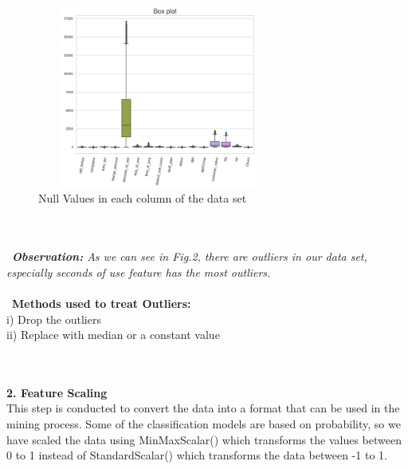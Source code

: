 \documentclass[a4paper, 10pt, conference]{ieeeconf}      %
\begin{document}
\begin{figure}[htp]
    \centering
    \includegraphics[width=8cm,height=6cm]{Images/boxplot.png}
    \caption{Null Values in each column of the data set}
    \label{fig:boxplot}
\end{figure}
\\\
\\\
\textit{\textbf{Observation:} As we can see in Fig.2, there are outliers in our data set, especially seconds of use feature has the most outliers.}
\\\
\\\
\textbf{Methods used to treat Outliers:}
\\i) Drop the outliers
\\ii) Replace with median or a constant value

\\\
\\\textbf{2. Feature Scaling}
\\This step is conducted to convert the data into a format that can be used in the mining process. Some of the classification models are based on probability, so we have scaled the data using MinMaxScalar() which transforms the values between 0 to 1 instead of StandardScalar() which transforms the data between -1 to 1.
 
\end{document}
